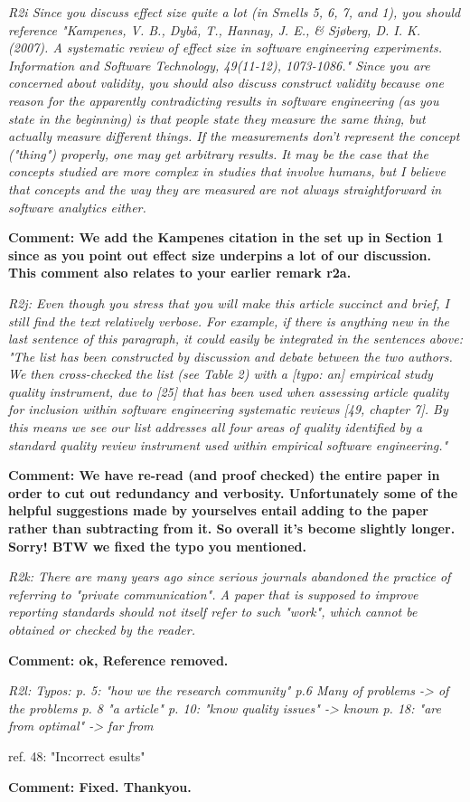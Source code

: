 \documentclass[preprint,10pt]{elsarticle}
\begin{document}
{\em
R2i
Since you discuss effect size quite a lot (in Smells 5, 6, 7, and 1), you should reference "Kampenes, V. B., Dybå, T., Hannay, J. E., & Sjøberg, D. I. K. (2007). A systematic review of effect size in software engineering experiments. Information and Software Technology, 49(11-12), 1073-1086."
Since you are concerned about validity, you should also discuss construct validity because one reason for the apparently contradicting results in software engineering (as you state in the beginning) is that people state they measure the same thing, but actually measure different things. If the measurements don't represent the concept ("thing") properly, one may get arbitrary results. It may be the case that the concepts studied are more complex in studies that involve humans, but I believe that concepts and the way they are measured are not always straightforward in software analytics either.
}

{\bf Comment: We add the Kampenes citation in the set up in Section 1 since as you point out effect size underpins a lot of our discussion.  This comment also relates to your earlier remark r2a.}

{\em
R2j: 
Even though you stress that you will make this article succinct and brief, I still find the text relatively verbose. For example, if there is anything new in the last sentence of this paragraph, it could easily be integrated in the sentences above: "The list has been constructed by discussion and debate between the two authors. We then cross-checked the list (see Table 2) with a [typo: an] empirical study quality instrument, due to [25] that has been used when assessing article quality for inclusion within software engineering systematic reviews [49, chapter 7]. By this means we see our list addresses all four areas of quality identified by a standard quality review instrument used within empirical software engineering."
}

{\bf Comment: We have re-read (and proof checked) the entire paper in order to cut out redundancy and verbosity.  Unfortunately some of the helpful suggestions made by yourselves entail adding to the paper rather than subtracting from it.  So overall it's become slightly longer.  Sorry!  BTW we fixed the typo you mentioned.}

{\em
R2k: 
There are many years ago since serious journals abandoned the practice of referring to "private communication". A paper that is supposed to improve reporting standards should not itself refer to such "work", which cannot be obtained or checked by the reader.

}

{\bf Comment: ok, Reference removed.}

{\em
R2l: 
Typos: 
p. 5: "how we the research community"
p.6 Many of problems -> of the problems
p. 8 "a article"
p. 10: "know quality issues" -> known
p. 18: "are from optimal" -> far from

ref. 48:  "Incorrect esults"

}

{\bf Comment: Fixed.  Thankyou.}
\end{document}
